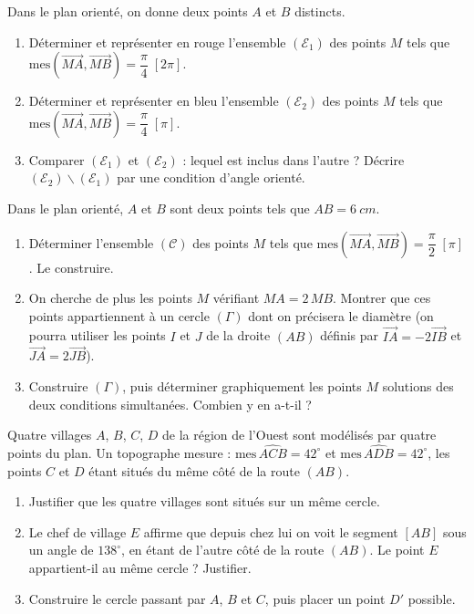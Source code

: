 \documentclass[11pt]{article}
\def\setminus{\mathbin{\backslash}}\let\smallsetminus\setminus
\begin{document}
\begin{exercice}
Dans le plan orienté, on donne deux points $A$ et $B$ distincts.
\begin{enumerate}
\item Déterminer et représenter en rouge l'ensemble $(\mathcal{E}_1)$ des points $M$ tels que $\mathrm{mes}(\overrightarrow{MA}, \overrightarrow{MB}) = \dfrac{\pi}{4} \; [2\pi]$.
\item Déterminer et représenter en bleu l'ensemble $(\mathcal{E}_2)$ des points $M$ tels que $\mathrm{mes}(\overrightarrow{MA}, \overrightarrow{MB}) = \dfrac{\pi}{4} \; [\pi]$.
\item Comparer $(\mathcal{E}_1)$ et $(\mathcal{E}_2)$ : lequel est inclus dans l'autre ? Décrire $(\mathcal{E}_2) \setminus (\mathcal{E}_1)$ par une condition d'angle orienté.
\end{enumerate}
\end{exercice}

\begin{exercice}
Dans le plan orienté, $A$ et $B$ sont deux points tels que $AB = \SI{6}{cm}$.
\begin{enumerate}
\item Déterminer l'ensemble $(\mathcal{C})$ des points $M$ tels que $\mathrm{mes}(\overrightarrow{MA}, \overrightarrow{MB}) = \dfrac{\pi}{2} \; [\pi]$. Le construire.
\item On cherche de plus les points $M$ vérifiant $MA = 2\,MB$. Montrer que ces points appartiennent à un cercle $(\Gamma)$ dont on précisera le diamètre (on pourra utiliser les points $I$ et $J$ de la droite $(AB)$ définis par $\overrightarrow{IA} = -2\overrightarrow{IB}$ et $\overrightarrow{JA} = 2\overrightarrow{JB}$).
\item Construire $(\Gamma)$, puis déterminer graphiquement les points $M$ solutions des deux conditions simultanées. Combien y en a-t-il ?
\end{enumerate}
\end{exercice}

\begin{exercice}
Quatre villages $A$, $B$, $C$, $D$ de la région de l'Ouest sont modélisés par quatre points du plan. Un topographe mesure : $\mathrm{mes}\,\widehat{ACB} = 42^{\circ}$ et $\mathrm{mes}\,\widehat{ADB} = 42^{\circ}$, les points $C$ et $D$ étant situés du même côté de la route $(AB)$.
\begin{enumerate}
\item Justifier que les quatre villages sont situés sur un même cercle.
\item Le chef de village $E$ affirme que depuis chez lui on voit le segment $[AB]$ sous un angle de $138^{\circ}$, en étant de l'autre côté de la route $(AB)$. Le point $E$ appartient-il au même cercle ? Justifier.
\item Construire le cercle passant par $A$, $B$ et $C$, puis placer un point $D'$ possible.
\end{enumerate}
\end{exercice}
\end{document}
